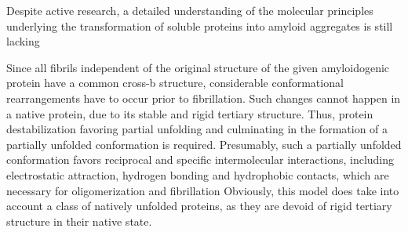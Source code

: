 





Despite active research, a detailed understanding of the molecular principles underlying the transformation of soluble proteins into amyloid aggregates is still lacking

Since all fibrils independent of the original structure of the given amyloidogenic protein have a common cross-b structure, considerable conformational rearrangements have to occur prior to fibrillation. 
Such changes cannot happen in a native protein, due to its stable and rigid tertiary structure. Thus, protein destabilization favoring partial unfolding and culminating in the formation of a partially unfolded conformation is required. 
Presumably, such a partially unfolded conformation favors reciprocal and specific intermolecular interactions, including electrostatic attraction, hydrogen bonding and hydrophobic contacts, which are necessary for oligomerization and fibrillation
Obviously, this model does take into account a class of natively unfolded proteins, as they are devoid of rigid tertiary structure in their native state.

